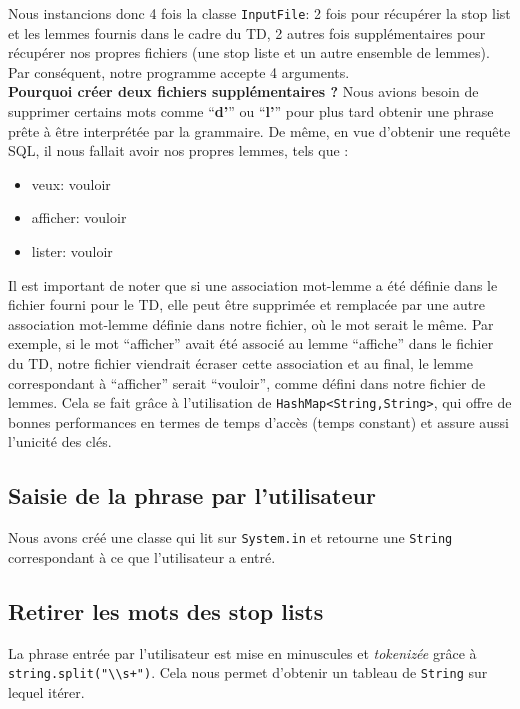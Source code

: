 Nous instancions donc 4 fois la classe \lstinline{InputFile}: 2 fois pour récupérer la stop list et les lemmes fournis dans le cadre du TD, 2 autres fois supplémentaires pour récupérer nos propres fichiers (une stop liste et un autre ensemble de lemmes). Par conséquent, notre programme accepte 4 arguments.\\
\textbf{Pourquoi créer deux fichiers supplémentaires ?} Nous avions besoin de supprimer certains mots comme ``\textbf{d'}'' ou ``\textbf{l'}'' pour plus tard obtenir une phrase prête à être interprétée par la grammaire. De même, en vue d'obtenir une requête SQL, il nous fallait avoir nos propres lemmes, tels que :

\begin{itemize}
  \item veux: vouloir
  \item afficher:    vouloir
  \item lister:      vouloir
\end{itemize}

Il est important de noter que si une association mot-lemme a été définie dans le fichier fourni pour le TD, elle peut être supprimée et remplacée par une autre association mot-lemme définie dans notre fichier, où le mot serait le même. Par exemple, si le mot ``afficher'' avait été associé au lemme ``affiche'' dans le fichier du TD, notre fichier viendrait écraser cette association et au final, le lemme correspondant à ``afficher'' serait ``vouloir'', comme défini dans notre fichier de lemmes. Cela se fait grâce à l'utilisation de \java\lstinline{HashMap<String,String>}, qui offre de bonnes performances en termes de temps d'accès (temps constant) et assure aussi l'unicité des clés.

\subsection{Saisie de la phrase par l'utilisateur}

Nous avons créé une classe qui lit sur \lstinline{System.in} et retourne une \lstinline{String} correspondant à ce que l'utilisateur a entré.

\subsection{Retirer les mots des stop lists}

La phrase entrée par l'utilisateur est mise en minuscules et \textit{tokenizée} grâce à \lstinline{string.split("\\s+")}. Cela nous permet d'obtenir un tableau de \lstinline{String} sur lequel itérer.

